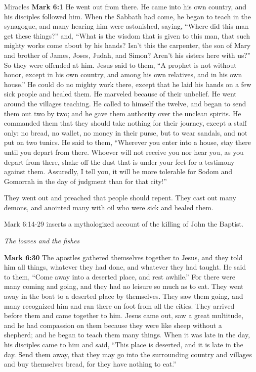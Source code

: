 \documentclass[10pt,twoside]{article} %
\newcommand{\quotesize}{\normalsize{}}
\newenvironment{quotetext}{\begingroup\quotesize}{\endgroup}
\newcommand{\bible}[2]{\begin{quotetext}\textbf{#1} #2\end{quotetext}}
\newcommand{\gospelmark}[2]{\bible{Mark #1}{#2}}
\newcommand{\subhead}[1]{\emph{#1}\par}
\begin{document}
\begin{section}{Miracles}
\gospelmark{6:1}{
He went out from there. He came into his own country, and his disciples followed him.   When the Sabbath had come, he began to teach in the synagogue, and many hearing him were astonished, saying, ``Where did this man get these things?'' and, ``What is the wisdom that is given to this man, that such mighty works come about by his hands?   Isn't this the carpenter, the son of Mary and brother of James, Joses, Judah, and Simon? Aren't his sisters here with us?'' So they were offended at him.
  Jesus said to them, ``A prophet is not without honor, except in his own country, and among his own relatives, and in his own house.''   He could do no mighty work there, except that he laid his hands on a few sick people and healed them.   He marveled because of their unbelief.
He went around the villages teaching.   He called to himself the twelve, and began to send them out two by two; and he gave them authority over the unclean spirits.   He commanded them that they should take nothing for their journey, except a staff only: no bread, no wallet, no money in their purse,   but to wear sandals, and not put on two tunics.   He said to them, ``Wherever you enter into a house, stay there until you depart from there.    Whoever will not receive you nor hear you, as you depart from there, shake off the dust that is under your feet for a testimony against them. Assuredly, I tell you, it will be more tolerable for Sodom and Gomorrah in the day of judgment than for that city!'' 

They went out and preached that people should repent.   They cast out many demons, and anointed many with oil who were sick and healed them.
}

Mark 6:14-29 inserts a mythologized account of the killing of John the Baptist.

\subhead{The loaves and the fishes}

\gospelmark{6:30}{
The apostles gathered themselves together to Jesus, and they told him all things, whatever they had done, and whatever they had taught.   He said to them, ``Come away into a deserted place, and rest awhile.'' For there were many coming and going, and they had no leisure so much as to eat.   They went away in the boat to a deserted place by themselves.   They saw them going, and many recognized him and ran there on foot from all the cities. They arrived before them and came together to him.   Jesus came out, saw a great multitude, and he had compassion on them because they were like sheep without a shepherd; and he began to teach them many things.   When it was late in the day, his disciples came to him and said, ``This place is deserted, and it is late in the day.   Send them away, that they may go into the surrounding country and villages and buy themselves bread, for they have nothing to eat.''

}
\end{section}
\end{document}
